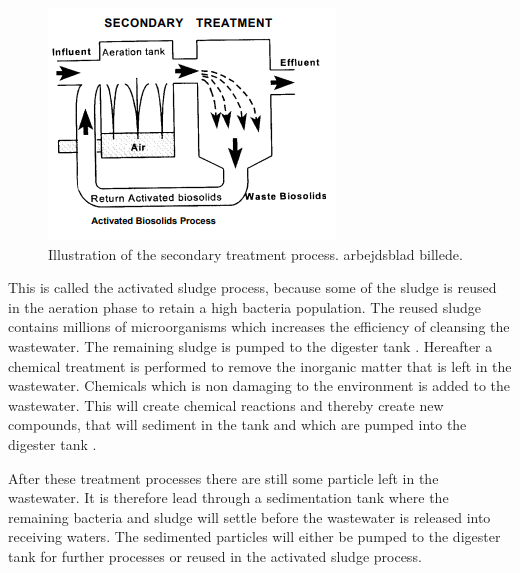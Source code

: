 \begin{figure}[H]
\centering
\includegraphics[width=.6\textwidth]{report/introduction/pictures/secondary_treatment.png}
\caption{Illustration of the secondary treatment process. arbejdsblad billede. }
\label{fig:secondary_treatment}%
\end{figure} 
This is called the activated sludge process, because some of the sludge is reused in the aeration phase to retain a high bacteria population. %
The reused sludge contains millions of microorganisms which increases the efficiency of cleansing the wastewater. The remaining sludge is pumped to the digester tank \cite{epa_wwtp}.
Hereafter a chemical treatment is performed to remove the inorganic matter that is left in the wastewater. Chemicals which is non damaging to the environment is added to the wastewater.
This will create chemical reactions and thereby create new compounds, that will sediment in the tank and which are pumped into the digester tank \cite{youtube_wastewater}.  

After these treatment processes there are still some particle left in the wastewater. It is therefore lead through a sedimentation tank where the remaining bacteria and sludge will settle before the wastewater is released into receiving waters. The sedimented particles will either be pumped to the digester tank for further processes or reused in the activated sludge process.


